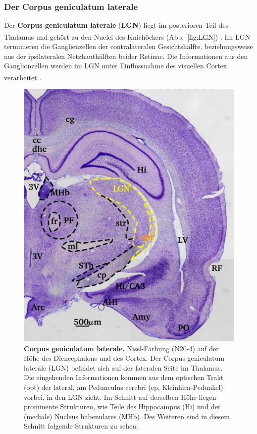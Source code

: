 \documentclass[12pt,a4paper,pdftex]{article}
\begin{document}
\newpage
\subsubsection*{Der Corpus geniculatum laterale}

Der \textbf{Corpus geniculatum laterale} (\textbf{LGN})  liegt im posterioren Teil des Thalamus und gehört zu den Nuclei des Kniehöckers (Abb.~\ref{fig:LGN}) \textsuperscript{\cite[12]{crossman2014neuroanatomy}}. Im LGN terminieren die Ganglienzellen der contralateralen Gesichtshälfte, beziehungsweise aus der ipsilateralen Netzhauthälften beider Retinae. Die Informationen aus den Ganglionzellen werden im LGN unter Einflussnahme des visuellen Cortex verarbeitet
\textsuperscript{\cite[8.1]{trepel2011neuroanatomie}}.

\begin{figure}[H]
    \centering
    \includegraphics{pictures/visual/LGN.png}
    \caption[Corpus geniculatum laterale]{\textbf{Corpus geniculatum laterale.} Nissl-Färbung (N20-4) auf der Höhe des Diencephalons und des Cortex. Der Corpus geniculatum laterale (LGN) befindet sich auf der lateralen Seite im Thalamus. Die eingehenden Informationen kommen aus dem optischen Trakt (opt) der lateral, am Pedunculus cerebri (cp, Kleinhirn-Pedunkel) vorbei, in den LGN zieht. Im Schnitt auf derselben Höhe liegen prominente Strukturen, wie Teile des Hippocampus (Hi) und der (mediale) Nucleus habenulares (MHb). Des Weiteren sind in diesem Schnitt folgende Strukturen zu sehen: 
}
\end{figure}
\end{document}
